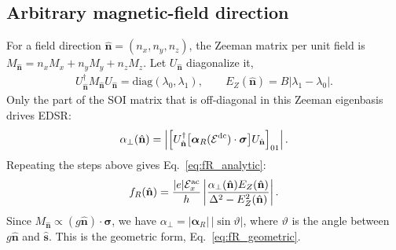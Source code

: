 \documentclass[
  aps,
  reprint,
  amsmath,
  amssymb,
  groupedaddress,
  floatfix,
  longbibliography,
]{revtex4-2}
\newcommand{\Eac}{\mathcal{E}^{\rm ac}_x}
\newcommand{\Edc}{\mathcal{E}^{\rm dc}}
\newcommand{\nhat}{\hat{\mathbf n}}
\newcommand{\shat}{\hat{\mathbf s}}
\begin{document}
\subsection{Arbitrary magnetic-field direction}
For a field direction $\nhat=(n_x,n_y,n_z)$, the Zeeman matrix per unit field is $M_{\nhat}=n_xM_x+n_yM_y+n_zM_z$. Let $U_{\nhat}$ diagonalize it,
\begin{align}
U_{\nhat}^{\dagger}
M_{\nhat}
U_{\nhat}
=
\mathrm{diag}(\lambda_0,\lambda_1),
\qquad
E_Z(\nhat)
=
B\left|\lambda_1-\lambda_0\right|.
\end{align}
Only the part of the SOI matrix that is off-diagonal in this Zeeman eigenbasis drives EDSR:
\begin{align}
\alpha_{\perp}(\nhat)
=
\left|
\left[
U_{\nhat}^{\dagger}
\big[\bm{\alpha}_R(\Edc)\cdot\bm{\sigma}\big]
U_{\nhat}
\right]_{01}
\right|.
\label{eq:alpha_perp}
\end{align}
Repeating the steps above gives Eq.~\eqref{eq:fR_analytic}:
\begin{align}
f_R(\nhat)
=
\frac{|e|\Eac}{h}
\left|
\frac{
\alpha_{\perp}(\nhat)
E_Z(\nhat)
}{
\Delta^2-E_Z^2(\nhat)
}
\right|.
\end{align}
Since $M_{\nhat}\propto(g\nhat)\cdot\bm\sigma$, we have $\alpha_\perp=|\bm{\alpha}_R|\,|\sin\vartheta|$, where $\vartheta$ is the angle between $g\nhat$ and $\shat$. This is the geometric form, Eq.~\eqref{eq:fR_geometric}.
\end{document}
